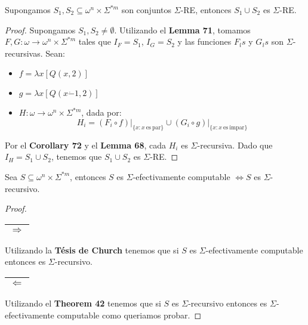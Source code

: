   \begin{corollary}
    \PN Supongamos $S_{1}, S_{2} \subseteq \omega^{n} \times \Sigma^{\ast m}$ son conjuntos $\Sigma$-RE, entonces
    $S_{1} \cup S_{2}$ es $\Sigma$-RE.
  \end{corollary}
  \begin{proof}
    \PN Supongamos $S_{1}, S_{2} \neq \emptyset$. Utilizando el \textbf{Lemma 71}, tomamos $F, G: \omega \rightarrow
    \omega^{n} \times \Sigma^{\ast m}$ tales que $I_{F}=S_{1}$, $I_{G}=S_{2}$ y las funciones $F_{i} {\acute{}} s$ y
    $G_{i} {\acute{}} s$ son $\Sigma $-recursivas. Sean:

    \begin{itemize}
      \item $f = \lambda x\left[Q(x,2)\right]$
      \item $g = \lambda x\left[Q(x\dot{-}1,2)\right]$
      \item $H: \omega \rightarrow \omega^{n} \times \Sigma^{\ast m}$, dada por:
        \[
          H_{i} = (F_{i} \circ f) \mathrm{\mid}_{\{x:x\mathrm{\ es\ par}\}} \cup (G_{i}\circ g)
          \mathrm{\mid}_{\{x:x\mathrm{\ es\ impar}\}}
        \]
    \end{itemize}

    \PN Por el \textbf{Corollary 72} y el \textbf{Lemma 68}, cada $H_{i}$ es $\Sigma$-recursiva. Dado que
    $I_{H} = S_{1} \cup S_{2}$, tenemos que $S_{1} \cup S_{2}$ es $\Sigma$-RE.
  \end{proof}

  \begin{theorem}
     \PN Sea $S \subseteq \omega^{n} \times \Sigma^{\ast m}$, entonces $S$ es $\Sigma$-efectivamente computable
     $\Leftrightarrow S$ es $\Sigma$-recursivo.
  \end{theorem}
  \begin{proof}
    \begin{tabular}{|c|} \hline $\Rightarrow$ \\\hline \end{tabular}
    \PN Utilizando la \textbf{Tésis de Church} tenemos que si $S$ es $\Sigma$-efectivamente computable entonces es
    $\Sigma$-recursivo.

    \vspace{5mm}
    \PN \begin{tabular}{|c|} \hline $\Leftarrow$ \\\hline \end{tabular}
    \vspace{3mm}
    \PN Utilizando el \textbf{Theorem 42} tenemos que si $S$ es $\Sigma$-recursivo entonces es $\Sigma$-efectivamente
    computable como queriamos probar.
  \end{proof}


